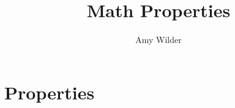 \documentclass{report}
\title{Math Properties}
\author{Amy Wilder}
\newcommand{\CalcNotation}{lagrange}
\theoremstyle{mytheoremstyle}
\theoremstyle{mytheoremstyle}
\theoremstyle{myproblemstyle}
\begin{document}
    \maketitle

    \chapter{Properties}

\end{document}

